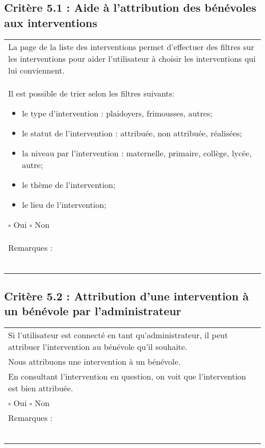 	\subsection*{Critère 5.1 : Aide à l'attribution des bénévoles aux interventions }
  		\begin{center}
    	 		\begin{tabular}[h]{|p{}|}
			\hline
				La page de la liste des interventions permet d'effectuer des filtres sur les interventions pour aider l'utilisateur à choisir les interventions qui lui conviennent.\\
				Il est possible de trier selon les filtres suivants: 
				\begin{itemize}
				\item le type d'intervention : plaidoyers, frimousses, autres;
				\item le statut de l'intervention : attribuée, non attribuée, réalisées;
				\item la niveau par l'intervention : maternelle, primaire, collège, lycée, autre;
				\item le thème de l'intervention;
				\item le lieu de l'intervention; 
				\end{itemize}
				
				$\square$ Oui  \hfill \hfill $\square$ Non \\\hline Remarques : \\ ~\\
			 \\\hline
     		\end{tabular}
  		\end{center}	
  		
  	\subsection*{Critère 5.2 : Attribution d'une intervention à un bénévole par l'administrateur}
  		\begin{center}
    	 		\begin{tabular}[h]{|p{}|}
			\hline
				Si l'utilisateur est connecté en tant qu'administrateur, il peut attribuer l'intervention au bénévole qu'il souhaite. \\
				Nous attribuons une intervention à un bénévole. \\
				En consultant l'intervention en question, on voit que l'intervention est bien attribuée. \\
				
				$\square$ Oui  \hfill \hfill $\square$ Non \\\hline Remarques : \\ ~\\
			 \\\hline
     		\end{tabular}
  		\end{center}	
  		
